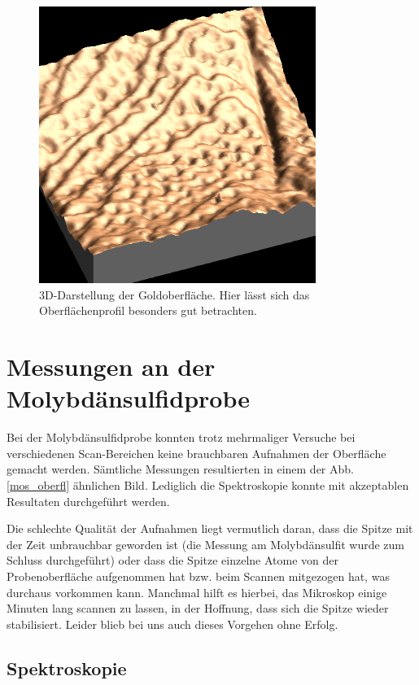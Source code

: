 \begin{figure}[H]
	\begin{center}
		\includegraphics[width=9cm]{Mess/gold3d.png}
		\caption{3D-Darstellung der Goldoberfläche. Hier lässt sich das Oberflächenprofil besonders gut betrachten.}
		\label{gold3d}
	\end{center}
\end{figure}


\section{Messungen an der Molybdänsulfidprobe}

Bei der Molybdänsulfidprobe konnten trotz mehrmaliger Versuche bei verschiedenen Scan-Bereichen keine brauchbaren Aufnahmen der Oberfläche gemacht werden. Sämtliche Messungen resultierten in einem der Abb. \ref{mos_oberfl} ähnlichen Bild. Lediglich die Spektroskopie konnte mit akzeptablen Resultaten durchgeführt werden.

Die schlechte Qualität der Aufnahmen liegt vermutlich daran, dass die Spitze mit der Zeit unbrauchbar geworden ist (die Messung am Molybdänsulfit wurde zum Schluss durchgeführt) oder dass die Spitze einzelne Atome von der Probenoberfläche aufgenommen hat bzw. beim Scannen mitgezogen hat, was durchaus vorkommen kann. Manchmal hilft es hierbei, das Mikroskop einige Minuten lang scannen zu lassen, in der Hoffnung, dass sich die Spitze wieder stabilisiert. Leider blieb bei uns auch dieses Vorgehen ohne Erfolg.

\subsection{Spektroskopie}
